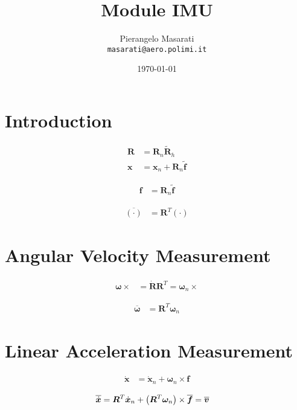 \documentclass{article}
\newcommand{\T}[1]{\bm{#1}}
\newcommand{\TT}[1]{\bm{#1}}
\begin{document}
\title{Module IMU}
\author{Pierangelo Masarati \\ \texttt{masarati@aero.polimi.it}}
\date{\today}
\maketitle


\section{Introduction}
\begin{subequations}
\begin{align}
	\TT{R}
	&=
	\TT{R}_n \tilde{\TT{R}}_h
	\\
	\T{x}
	&=
	\T{x}_n
	+
	\TT{R}_n \tilde{\T{f}}
\end{align}
\end{subequations}

\begin{align}
	\T{f}
	&=
	\TT{R}_n \tilde{\T{f}}
\end{align}

\begin{align}
	\overline{(\cdot)}
	&=
	\TT{R}^T (\cdot)
\end{align}

\section{Angular Velocity Measurement}
\begin{align}
	\T{\omega}\times{}
	&=
	\dot{\TT{R}}\TT{R}^T
	=
	\T{\omega}_n\times{}
\end{align}

\begin{align}
	\overline{\T{\omega}}
	&=
	\TT{R}^T \T{\omega}_n
\end{align}

\section{Linear Acceleration Measurement}
\begin{align}
	\dot{\T{x}}
	&=
	\dot{\T{x}}_n
	+
	\T{\omega}_n \times \T{f}
\end{align}

\begin{align}
	\overline{\dot{\T{x}}}
	&=
	\TT{R}^T \dot{\T{x}}_n
	+
	\plbr{\TT{R}^T \T{\omega}_n} \times \overline{\T{f}}
	=
	\overline{\T{v}}
\end{align}
\end{document}
